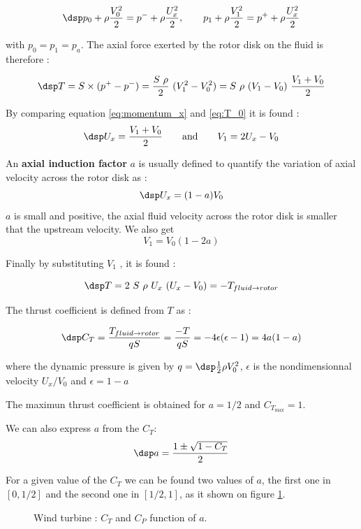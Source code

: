 $$ \dsp 
p_0 +\rho  \frac{V_0^2}{2} = p^- + \rho  \frac{U_x^2}{2}, \qquad
p_1 +\rho  \frac{V_1^2}{2} = p^+ + \rho  \frac{U_x^2}{2}
$$

with $p_0=p_1=p_a$. The  axial force exerted by the rotor disk  on the fluid
is therefore :

\begin{equation} \dsp 
T = S \times (p^+-p^-) = \frac{S ~\rho}{2}~(V_1^2-V_0^2)= S ~\rho~(V_1-V_0)~ \frac{V_1+V_0}{2}
\label{eq:T_0}
\end{equation}

By comparing equation \eqref{eq:momentum_x} and \eqref{eq:T_0} it is found :
$$ \dsp
U_x = \frac{V_1+V_0}{2}  \qquad {\rm and} \qquad V_1 = 2 U_x -V_0
$$



An \textbf{axial induction factor} $a$ is usually defined to quantify the variation  of axial velocity across the 
rotor disk as :
\begin{equation} \dsp 
U_x = (1-a) V_0
\label{eq:def_a_0}
\end{equation}
$a$ is small and positive, the axial fluid velocity across the rotor  disk is smaller that the upstream velocity.
We also  get $$V_1 = V_0 (1-2 a)$$


Finally by substituting $V_1$ , it is found :

\begin{equation} \dsp 
T =  2~S~\rho~U_x~(U_x-V_0) = - T_{fluid\to rotor}
\end{equation}


The thrust coefficient is defined from $T$ as :

$$
\dsp
C_T = \frac{T_{fluid\to rotor}}{q S} = \frac{-T}{q S} = - 4 \epsilon (\epsilon -1) = 4 a (1- a)
$$


where the dynamic pressure is given by $q =\dsp \frac{1}{2} \rho V_0^2$, 
$\epsilon$ is  the nondimensionnal velocity $U_x/V_0$ and $\epsilon = 1 - a$

The maximun thrust coefficient is obtained for $a=1/2$ and $C_{T_{\max}} = 1$.

We can also express $a$ from the $C_T$:
$$ \dsp
a = \frac{1\pm\sqrt{1-C_T}}{2}
$$

For a given value of the $C_T$ we can be found two values of $a$, the first one in $[0, 1/2]$
and the second one in $[1/2, 1]$, as it shown on figure \ref{fig:C_T}.

\begin{figure}[h]
  \begin{center}
  
  \caption{ Wind turbine : $C_T$ and $C_P$ function of $a$.}
  \label{fig:C_T}
  \end{center}
\end{figure}

